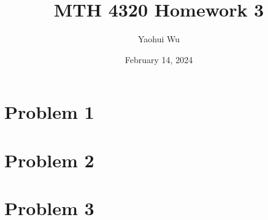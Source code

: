 \documentclass[12pt, letterpaper]{article}
\title{MTH 4320 Homework 3}
\author{Yaohui Wu}
\date{February 14, 2024}
\begin{document}
\maketitle
\section*{Problem 1}
\section*{Problem 2}
\section*{Problem 3}
\end{document}
